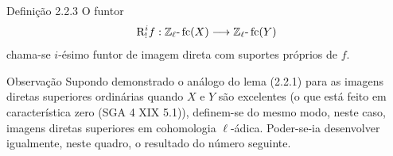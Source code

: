 \begin{statement}{Definição 2.2.3}
O funtor
\[
\mathrm{R}^i_!f:\mathbb Z_\ell\text{-}\operatorname{fc}(X)\longrightarrow \mathbb Z_\ell\text{-}\operatorname{fc}(Y)
\]
chama-se \(i\)-ésimo funtor de imagem direta com suportes próprios de \(f\).
\end{statement}

\begin{statement}{Observação}
Supondo demonstrado o análogo do lema (2.2.1) para as imagens diretas superiores ordinárias quando \(X\) e \(Y\) são excelentes (o que está feito em característica zero (SGA 4 XIX 5.1)), definem-se do mesmo modo, neste caso, imagens diretas superiores em cohomologia \(\ell\)-ádica. Poder-se-ia desenvolver igualmente, neste quadro, o resultado do número seguinte.
\end{statement}

